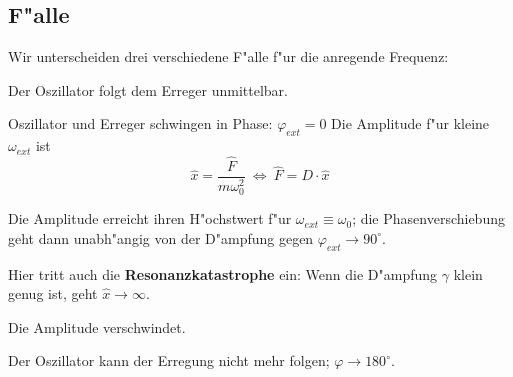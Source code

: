 \subsection{F"alle}
\label{kap_falle}



Wir unterscheiden drei verschiedene F"alle f"ur die anregende Frequenz:
\begin{description}[\setlabelstyle{\bfseries\slshape}]
\item[Kleine Frequenzen $\omega_{ext} \ll \omega_0$]
Der Oszillator folgt dem Erreger unmittelbar.

Oszillator und Erreger schwingen in Phase: $\varphi_{ext} =0$ Die
Amplitude f"ur kleine $\omega_{ext}$ ist 
$$
\hat x = \frac{\hat F}{m\omega_0^2} ~\Leftrightarrow ~ \hat F = D \cdot
\hat x
$$

\item["Ahnliche Frequenzen $\omega_{ext} \approx \omega_0$] 
Die Amplitude erreicht ihren H"ochstwert f"ur $\omega_{ext} \equiv
\omega_0$; die Phasenverschiebung geht dann unabh"angig von der
D"ampfung gegen $\varphi_{ext} \to 90^\circ$.

Hier tritt auch die \textbf{Resonanzkatastrophe} ein: Wenn die
D"ampfung $\gamma$ klein genug ist, geht $\hat x \to \infty$.

\item[Hohe Frequenzen $\omega_{ext} \gg \omega_0$] 
Die Amplitude verschwindet.

Der Oszillator kann der Erregung nicht mehr folgen; $\varphi \to 180^\circ$.
\end{description}


